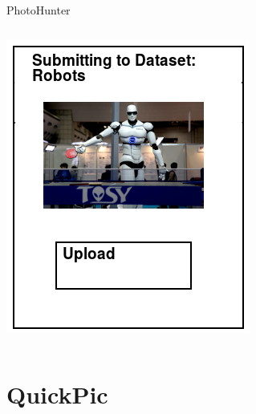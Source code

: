 \documentclass[aspectratio=169]{beamer}
\begin{document}
\begin{frame}{PhotoHunter}
\begin{columns}[c]
\begin{column}{0.5\columnwidth}
      \includegraphics[width=\textwidth,height=\textheight,keepaspectratio]{ss_photohunter_upload}
    \end{column}
  \end{columns}
\end{frame}

\section{QuickPic}
\end{document}
